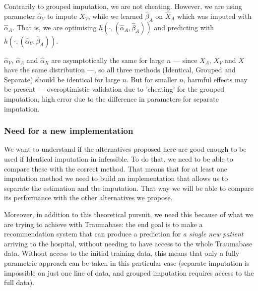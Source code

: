 Contrarily to grouped imputation, we are not cheating. However, we are using parameter $\hat{\alpha}_V$ to impute $X_V$, while we learned $\hat{\beta}_A$ on $\hat{X}_A$ which was imputed with $\hat{\alpha}_A$. That is, we are optimising $h(\cdot,(\hat{\alpha}_A, \hat{\beta}_A))$ and predicting with $h(\cdot,(\hat{\alpha}_V, \hat{\beta}_A))$.

$\hat{\alpha}_V$, $\hat{\alpha}_A$ and $\hat{\alpha}_X$ are asymptotically the same for large $n$ --- since $X_A$, $X_V$ and $X$ have the same distribution ---, so all three methods (Identical, Grouped and Separate) should be identical for large $n$. But for smaller $n$, harmful effects may be present --- overoptimistic validation due to 'cheating' for the grouped imputation, high error due to the difference in parameters for separate imputation.


			\subsubsection{Need for a new implementation}
We want to understand if the alternatives proposed here are good enough to be used if Identical imputation in infeasible. To do that, we need to be able to compare these with the correct method. That means that for at least one imputation method we need to build an implementation that allows us to separate the estimation and the imputation. That way we will be able to compare its performance with the other alternatives we propose.

Moreover, in addition to this theoretical pursuit, we need this because of what we are trying to achieve with Traumabase: the end goal is to make a recommendation system that can produce a prediction for \emph{a single new patient} arriving to the hospital, without needing to have access to the whole Traumabase data. Without access to the initial training data, this means that only a fully parametric approach can be taken in this particular case (separate imputation is impossible on just one line of data, and grouped imputation requires access to the full data).

